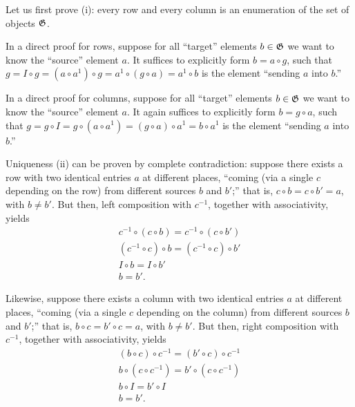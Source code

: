 {\color{OliveGreen}
\bproof
Let us first prove (i): every row and every column is an enumeration of the set of objects ${\frak G}$.

In a direct proof for rows, suppose
for all ``target'' elements $b\in {\frak G}$ we want to know the ``source'' element $a$.
It suffices to explicitly form $b= a \circ g$,
such that $g = I \circ  g =  (a \circ a^{1}) \circ g = a^{1} \circ (g \circ a) =  a^{1}   \circ b $ is the element ``sending $a$ into $b$.''


In a direct proof for columns, suppose
for all ``target'' elements $b\in {\frak G}$ we want to know the ``source'' element $a$.
It again suffices to explicitly form $b= g \circ a$,
such that $g =  g \circ I = g \circ (a \circ a^{1}) = (g \circ a) \circ a^{1} =   b   \circ a^{1}$ is the element ``sending $a$ into $b$.''



Uniqueness (ii) can be proven by complete contradiction:
suppose there exists a row with two identical entries $a$ at different places, ``coming (via a single $c$ depending on the row)
from different sources $b$ and $b'$;''
that is, $c \circ b =   c \circ b' = a$, with $b \neq b'$.
But then, left composition with $c^{-1}$, together with associativity, yields
\begin{equation}
\begin{split}
c^{-1} \circ (c \circ b) = c^{-1} \circ  (c \circ b') \\
(c^{-1} \circ c) \circ b = (c^{-1} \circ  c) \circ b' \\
I \circ b = I \circ b' \\
b = b' .
\end{split}
\label{2017-m-ch-gt-pouer}
\end{equation}

Likewise,
suppose there exists a column with two identical entries $a$ at different places, ``coming (via a single $c$ depending on the column)
from different sources $b$ and $b'$;''
that is, $b \circ  c =  b' \circ  c = a$, with $b \neq b'$.
But then, right composition with $c^{-1}$, together with associativity, yields
\begin{equation}
\begin{split}
(b \circ  c) \circ c^{-1}=  (b' \circ  c) \circ c^{-1}\\
b \circ  (c \circ c^{-1})=  b' \circ  (c \circ c^{-1})\\
b \circ  I=  b' \circ  I\\
b  =  b'
.
\end{split}
\label{2017-m-ch-gt-pouec}
\end{equation}
\eproof
}

